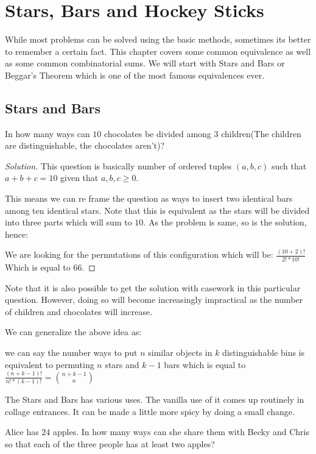 \chapter{Stars, Bars and Hockey Sticks}
While most problems can be solved using the basic methods, sometimes its better to 
remember a certain fact. This chapter covers some common equivalence as well as some 
common combinatorial sums. We will start with Stars and Bars or Beggar's Theorem which 
is one of the most famous equivalences ever.
\section{Stars and Bars}
\begin{example}
     In how many ways can $10$ chocolates be divided 
    among $3$ children(The children are distinguishable, the chocolates aren't)?
\end{example}
\begin{proof}
    [Solution]
    This question is basically number of ordered tuples $(a,b,c)$ such 
    that $a+b+c=10$ given that $a,b,c \geq 0$.\par
This means we can re frame the question as ways to insert two 
identical bars among ten identical stars. Note that this is equivalent 
as the stars will be divided into three parts which will sum to $10$. As the 
problem is same, so is the solution, hence:\par
We are looking for the permutations of this configuration which will be: 
$\frac{(10+2)!}{2!*10!}$ Which is equal to $66$.
\end{proof}
Note that it is also possible to get the solution with casework in this 
particular question. However, doing so will become increasingly impractical 
as the number of children and chocolates will increase.\par 
We can generalize the above idea as:
\begin{theorem}
    we can say the number ways to put $n$ similar objects in $k$ distinguishable bins 
    is equivalent to permuting $n$ stars and $k-1$ bars which is equal 
    to $\frac{(n+k-1)!}{n!*(k-1)!}=\binom{n+k-1}{n}$
\end{theorem}
The Stars and Bars has various uses. The vanilla use of it comes up 
routinely in collage entrances. It can be made a little more spicy by doing a small change.
\begin{example}
    Alice has $24$ apples. In how many ways can she share them with Becky and 
    Chris so that each of the three people has at least two apples?
\end{example}
